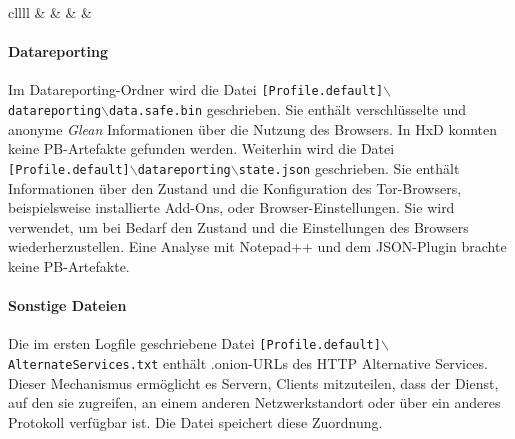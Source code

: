 \begin{appendices}
{\begin{landscape}
\begin{table}[h!]
{\begin{tabular}{cllll}
	           &                                                                  &  &             &  \\ \hline
	\end{tabular}
	}
	\end{table}
\end{landscape}
}
\restoregeometry


\paragraph*{Datareporting}
Im \glqq{}Datareporting\grqq{}-Ordner wird die Datei \texttt{[Profile.default]$\backslash$\\datareporting$\backslash$data.safe.bin} geschrieben. Sie enthält verschlüsselte und anonyme \textit{Glean} Informationen über die Nutzung des Browsers. \cite{GitHub.05.06.2023b}
In HxD konnten keine PB-Artefakte gefunden werden.
Weiterhin wird die Datei \texttt{[Profile.default]$\backslash$datareporting$\backslash$state.json} geschrieben.
Sie enthält Informationen über den Zustand und die Konfiguration des Tor-Browsers, beispielsweise installierte Add-Ons, oder Browser-Einstellungen. Sie wird verwendet, um bei Bedarf den Zustand und die Einstellungen des Browsers wiederherzustellen. \cite{GitHub.08.04.2019}
Eine Analyse mit Notepad++ und dem JSON-Plugin brachte keine PB-Artefakte.

\paragraph*{Sonstige Dateien}
Die im ersten Logfile geschriebene Datei \texttt{[Profile.default]$\backslash$\\AlternateServices.txt}
enthält .onion-URLs des HTTP Alternative Services. Dieser Mechanismus ermöglicht es Servern, Clients mitzuteilen, dass der Dienst, auf den sie zugreifen, an einem anderen Netzwerkstandort oder über ein anderes Protokoll verfügbar ist. Die Datei speichert diese Zuordnung. \cite{MozillaSupport.26.10.2020}


\end{appendices}
